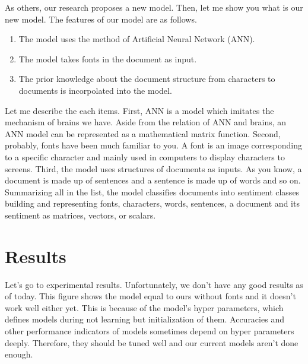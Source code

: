 \documentclass{notes}
\begin{document}
As others, our research proposes a new model.
Then, let me show you what is our new model.
The features of our model are as follows.
\begin{enumerate}
  \item The model uses the method of Artificial Neural Network (ANN).
  \item The model takes fonts in the document as input.
  \item The prior knowledge about the document structure
        from characters to documents is incorpolated into the model.
\end{enumerate}
Let me describe the each items.
First, ANN is a model which imitates the mechanism of brains we have.
Aside from the relation of ANN and brains, an ANN model can be represented
as a mathematical matrix function.
Second, probably, fonts have been much familiar to you.
A font is an image corresponding to a specific character
and mainly used in computers to display characters to screens.
Third, the model uses structures of documents as inputs.
As you know, a document is made up of sentences
and a sentence is made up of words and so on.
Summarizing all in the list,
the model classifies documents into sentiment classes
building and representing fonts, characters, words, sentences, a document
and its sentiment as matrices, vectors, or scalars.


\section{Results}

Let's go to experimental results.
Unfortunately, we don't have any good results as of today.
This figure shows the model equal to ours without fonts
and it doesn't work well either yet.
This is because of the model's hyper parameters,
which defines models during not learning but initialization of them.
Accuracies and other performance indicators of models
sometimes depend on hyper parameters deeply.
Therefore, they should be tuned well and our current models aren't done enough.
\end{document}
